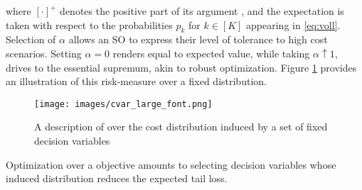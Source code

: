where $[\cdot]^+$ denotes the positive part of its argument  \cite{rockafellar2000optimization}, and the expectation is taken with respect to the probabilities $p_k$ for $k\in[K]$ appearing in \eqref{eq:voll}. Selection of $\alpha$ allows an SO to express their level of tolerance to high cost scenarios. Setting $\alpha = 0$ renders \CVaR{} equal to expected value, while taking $\alpha \uparrow 1$, drives \CVaR{} to the essential supremum, akin to robust optimization. Figure \ref{fig:cvar} provides an illustration of this risk-measure over a fixed distribution.
%
\begin{figure}
    \centering
    \texttt{[image: images/cvar\_large\_font.png]}
    \caption{A description of \CVaR{} over the cost distribution induced by a set of fixed decision variables}
    \label{fig:cvar}
\end{figure}
%
Optimization over a \CVaR{} objective amounts to selecting decision variables whose induced distribution reduces the expected tail loss. 


